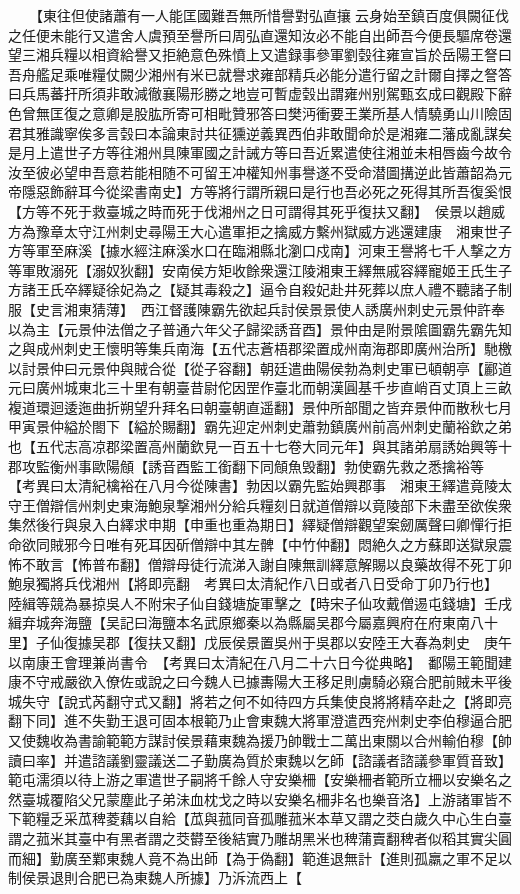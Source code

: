 　　【東往但使諸蕭有一人能匡國難吾無所惜譽對弘直攘云身始至鎮百度俱闕征伐之任便未能行又遣舍人虞預至譽所曰周弘直還知汝必不能自出師吾今便長驅席卷還望三湘兵糧以相資給譽又拒絶意色殊憤上又遣録事參軍劉㲄往雍宣旨於岳陽王詧曰吾舟艦足乘唯糧仗闕少湘州有米已就譽求雍部精兵必能分遣行留之計爾自擇之詧答曰兵馬蕃扞所須非敢減徹襄陽形勝之地豈可暫虚㲄出謂雍州别駕甄玄成曰觀殿下辭色曾無匡復之意卿是股肱所寄可相毗贊邪答曰樊沔衝要王業所基人情驍勇山川險固君其雅識寧俟多言㲄曰本論東討共征獯逆義異西伯非敢聞命於是湘雍二藩成亂謀矣是月上遣世子方等往湘州具陳軍國之計誡方等曰吾近累遣使往湘並未相唇齒今故令汝至彼必望申吾意若能相随不可留王冲權知州事譽遂不受命潜圖搆逆此皆蕭韶為元帝隱惡飾辭耳今從梁書南史】方等將行謂所親曰是行也吾必死之死得其所吾復奚恨【方等不死于救臺城之時而死于伐湘州之日可謂得其死乎復扶又翻】　侯景以趙威方為豫章太守江州刺史尋陽王大心遣軍拒之擒威方繫州獄威方逃還建康　湘東世子方等軍至麻溪【據水經注麻溪水口在臨湘縣北瀏口戍南】河東王譽將七千人撃之方等軍敗溺死【溺奴狄翻】安南侯方矩收餘衆還江陵湘東王繹無戚容繹寵姬王氏生子方諸王氏卒繹疑徐妃為之【疑其毒殺之】逼令自殺妃赴井死葬以庶人禮不聽諸子制服【史言湘東猜薄】　西江督護陳霸先欲起兵討侯景景使人誘廣州刺史元景仲許奉以為主【元景仲法僧之子普通六年父子歸梁誘音酉】景仲由是附景隂圖霸先霸先知之與成州刺史王懷明等集兵南海【五代志蒼梧郡梁置成州南海郡即廣州治所】馳檄以討景仲曰元景仲與賊合從【從子容翻】朝廷遣曲陽侯勃為刺史軍已頓朝亭【酈道元曰廣州城東北三十里有朝臺昔尉佗因罡作臺北而朝漢圓基千步直峭百丈頂上三畝複道環迴逶迤曲折朔望升拜名曰朝臺朝直遥翻】景仲所部聞之皆弃景仲而散秋七月甲寅景仲縊於閤下【縊於賜翻】霸先迎定州刺史蕭勃鎮廣州前高州刺史蘭裕欽之弟也【五代志高凉郡梁置高州蘭欽見一百五十七卷大同元年】與其諸弟扇誘始興等十郡攻監衡州事歐陽頠【誘音酉監工銜翻下同頠魚毁翻】勃使霸先救之悉擒裕等　【考異曰太清紀檎裕在八月今從陳書】勃因以霸先監始興郡事　湘東王繹遣竟陵太守王僧辯信州刺史東海鮑泉撃湘州分給兵糧刻日就道僧辯以竟陵部下未盡至欲俟衆集然後行與泉入白繹求申期【申重也重為期日】繹疑僧辯觀望案劒厲聲曰卿憚行拒命欲同賊邪今日唯有死耳因斫僧辯中其左髀【中竹仲翻】悶絶久之方蘇即送獄泉震怖不敢言【怖普布翻】僧辯母徒行流涕入謝自陳無訓繹意解賜以良藥故得不死丁卯鮑泉獨將兵伐湘州【將即亮翻　考異曰太清紀作八日或者八日受命丁卯乃行也】　陸緝等競為暴掠吳人不附宋子仙自錢塘旋軍擊之【時宋子仙攻戴僧逷屯錢塘】壬戌緝弃城奔海鹽【吴記曰海鹽本名武原鄉秦以為縣屬吴郡今屬嘉興府在府東南八十里】子仙復據吴郡【復扶又翻】戊辰侯景置吳州于吳郡以安陸王大春為刺史　庚午以南康王會理兼尚書令　【考異曰太清紀在八月二十六日今從典略】　鄱陽王範聞建康不守戒嚴欲入僚佐或說之曰今魏人已據夀陽大王移足則虜騎必窺合肥前賊未平後城失守【說式芮翻守式又翻】將若之何不如待四方兵集使良將將精卒赴之【將即亮翻下同】進不失勤王退可固本根範乃止會東魏大將軍澄遣西兖州刺史李伯穆逼合肥又使魏收為書諭範範方謀討侯景藉東魏為援乃帥戰士二萬出東關以合州輸伯穆【帥讀曰率】并遣諮議劉靈議送二子勤廣為質於東魏以乞師【諮議者諮議參軍質音致】範屯濡須以待上游之軍遣世子嗣將千餘人守安樂柵【安樂柵者範所立柵以安樂名之然臺城覆陷父兄蒙塵此子弟沬血枕戈之時以安樂名柵非名也樂音洛】上游諸軍皆不下範糧乏采苽稗菱藕以自給【苽與菰同音孤雕菰米本草又謂之茭白歲久中心生白臺謂之菰米其臺中有黑者謂之茭欎至後結實乃雕胡黑米也稗蒲賣翻稗者似稻其實尖圓而細】勤廣至鄴東魏人竟不為出師【為于偽翻】範進退無計【進則孤羸之軍不足以制侯景退則合肥已為東魏人所據】乃泝流西上【